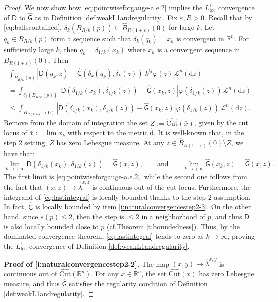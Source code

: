 \documentclass[11pt,a4paper]{article}
\theoremstyle{plain}
\theoremstyle{definition}
\theoremstyle{remark}
\numberwithin{equation}{section}
\newcommand{\R}{\mathbb{R}} %
\newcommand{\Cut}{\mathrm{Cut}}
\newcommand{\loc}{\mathrm{loc}}
\newcommand{\di}{\mathrm{d}}
\newcommand{\sfd}{\mathsf d}
\newcommand{\sfD}{\mathsf D}
\newcommand{\sfG}{\mathsf G}
\begin{document}
\begin{proof}
We now show how \eqref{eq:pointwiseforgauge-a.e.2} implies the $L^1_{\loc}$ convergence of $\sfD$ to $\hat{\sfG}$ as in Definition \ref{def:weakL1andregularity}. Fix $\varepsilon,R>0$. Recall that by \eqref{eq:ballscontained}, $\delta_k(B_{R/k}(p))\subseteq \hat{B}_{R(1+\varepsilon)}(0)$ for large $k$. Let $q_k\in B_{R/k}(p)$ form a sequence such that $\delta_k(q_k) = x_k$ is convergent in $\R^n$. For sufficiently large $k$, then $q_k = \delta_{1/k}(x_k)$ where $x_k$ is a convergent sequence in $B_{R(1+\varepsilon)}(0)$. Then
\begin{multline}
\int_{B_{R/k}(p)} |\sfD(q_k,z) - \hat{\sfG}(\delta_k(q_k),\delta_k(z))|k^Q \varphi(z)\,\mathscr{L}^n(\di z) \\
 =
\int_{\delta_k(B_{R/k}(p))} |\sfD(\delta_{1/k}(x_k),\delta_{1/k}(z)) - \hat{\sfG}(x_k,z)|\varphi(\delta_{1/k}(z))\,\mathscr{L}^n(\di z)  \\
 \leq \int_{\hat{B}_{R(1+\varepsilon)}(0)}|\sfD(\delta_{1/k}(x_k),\delta_{1/k}(z))-\hat{\sfG}(x_k,z)|\varphi(\delta_{1/k}(z))\,\mathscr{L}^n(\di z) .\label{eq:lastintegral}
\end{multline}
Remove from the domain of integration the set $Z:=\widehat{\Cut}(\bar{x})$, given by the cut locus of $\bar{x}:=\lim x_k$ with respect to the metric $\hat{\sfd}$. It is well-known that, in the step $2$ setting, $Z$ has zero Lebesgue measure. At any $z\in \hat{B}_{R(1+\varepsilon)}(0) \setminus Z$, we have that:
\begin{equation}
\lim_{k\to +\infty}\sfD(\delta_{1/k}(x_k),\delta_{1/k}(z)) = \hat{\sfG}(\bar{x},z), \qquad \text{and} \qquad \lim_{k\to +\infty}\hat{\sfG}(x_k,z) = \hat{\sfG}(\bar{x},z).
\end{equation}
The first limit is \eqref{eq:pointwiseforgauge-a.e.2}, while the second one follows from the fact that $(x,z)\mapsto\hat{\lambda}^{x,z}$ is continuous out of the cut locus. Furthermore, the integrand of  \eqref{eq:lastintegral} is locally bounded thanks to the step $2$ assumption. In fact, $\hat{\sfG}$ is locally bounded by item \ref{i:naturalconvergencestep2-3}. On the other hand, since $s(p)\leq 2$, then the step is $\leq 2$ in a neighborhood of $p$, and thus $\sfD$ is also locally bounded close to $p$ (cf.\@ Theorem \ref{t:boundedness}). Thus, by the dominated convergence theorem, \eqref{eq:lastintegral} tends to zero as $k\to \infty$, proving the $L^1_{\loc}$ convergence of Definition \ref{def:weakL1andregularity}.

\textbf{Proof of \ref{i:naturalconvergencestep2-2}.} The map $(x,y)\mapsto \hat{\lambda}^{x,y}$ is continuous out of $\widehat{\Cut}(\R^n)$. For any $x\in \R^n$, the set $\widehat{\Cut}(x)$ has zero Lebesgue measure, and thus $\hat{\sfG}$ satisfies the regularity condition of Definition \ref{def:weakL1andregularity}.


\end{proof}
\end{document}
